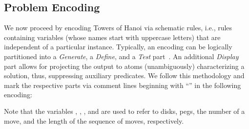 \subsection{Problem Encoding}

We now proceed by encoding Towers of Hanoi via schematic rules,
i.e., rules containing variables (whose names start with uppercase letters)
that are independent of a particular instance.
Typically, an encoding can be logically partitioned
into a \emph{Generate}, a \emph{Define}, and a \emph{Test} part~\cite{lifschitz02a}.
An additional \emph{Display} part allows for projecting
the output to atoms (unambiguously) characterizing a solution,
thus, suppressing auxiliary predicates.
We follow this methodology and
mark the respective parts via comment lines beginning with ``\code{\%}'' 
in the following encoding:%
%
%

%
Note that the variables , , , and  are used
to refer to disks, pegs, 
the number of a move, and the length of the sequence of moves, respectively.


